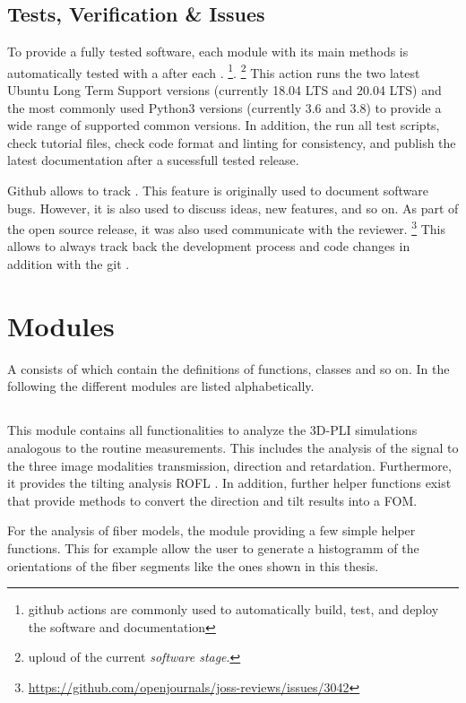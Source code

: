 \subsection{Tests, Verification \& Issues}
%
To provide a fully tested software, each module with its main methods is automatically tested with a  after each .
\footnote{github actions are commonly used to automatically build, test, and deploy the software and documentation}.
\footnote{uploud of the current \textit{software stage}.}
This action runs the two latest Ubuntu Long Term Support versions (currently 18.04 LTS and 20.04 LTS) and the most commonly used Python3 versions (currently 3.6 and 3.8) to provide a wide range of supported common versions.
In addition, the  run all test scripts, check tutorial files, check code format and linting for consistency, and publish the latest documentation after a sucessfull tested release.
\par
%
Github allows to track .
This feature is originally used to document software bugs.
However, it is also used to discuss ideas, new features, and so on.
As part of the open source release, it was also used communicate with the reviewer.
\footnote{\url{https://github.com/openjournals/joss-reviews/issues/3042}}
This allows to always track back the development process and code changes in addition with the git .
%
% 
% 
\section{Modules}
%
A \python{}  consists of  which contain the definitions of functions, classes and so on.
In the following the different modules are listed alphabetically.
%
%
%
\subsection{}
%
This module contains all functionalities to analyze the \ac{3D-PLI} simulations analogous to the routine measurements.
This includes the analysis of the signal to the three image modalities transmission, direction and retardation.
Furthermore, it provides the tilting analysis \ac{ROFL} \cite{Schmitz2018}.
In addition, further helper functions exist that provide methods to convert the direction and tilt results into a \ac{FOM}.
\par
% 
For the analysis of fiber models, the module providing a few simple helper functions.
This for example allow the user to generate a histogramm of the orientations of the fiber segments like the ones shown in this thesis.
%
% 
% 
